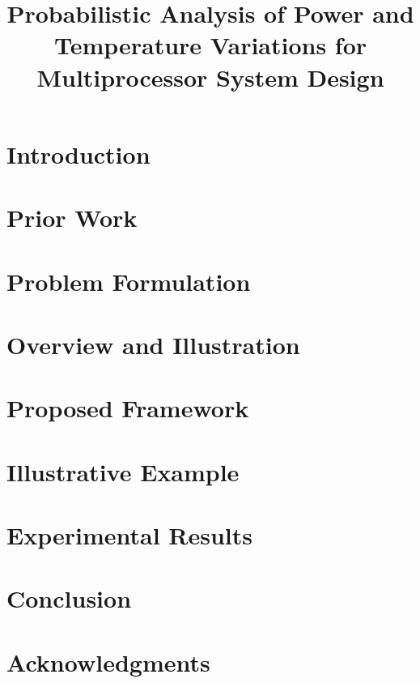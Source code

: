 \documentclass[journal]{IEEEtran}
\begin{document}
  \title{Probabilistic Analysis of Power and Temperature Variations for Multiprocessor System Design}

  \author{
    
  }

  \maketitle

  \begin{abstract}
    
  \end{abstract}

  \section{Introduction} 
  

  \section{Prior Work} 
  

  \section{Problem Formulation}    
  

  \section{Overview and Illustration} 
  

  \section{Proposed Framework} 
  

  \section{Illustrative Example} 
  

  \section{Experimental Results} 
  

  \section{Conclusion} 
  

  \section{Acknowledgments}
  

  \printbibliography

  \appendix
  
\end{document}
